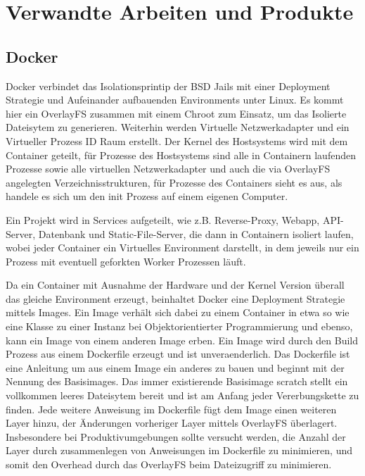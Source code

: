 \section{Verwandte Arbeiten und Produkte}
\label{sec:related-work}

\subsection{Docker}
Docker verbindet das Isolationsprintip der BSD Jails mit einer Deployment
Strategie und Aufeinander aufbauenden Environments unter Linux.
Es kommt hier ein OverlayFS zusammen mit einem Chroot zum Einsatz, um das
Isolierte Dateisytem zu generieren. Weiterhin werden Virtuelle Netzwerkadapter
und ein Virtueller Prozess ID Raum erstellt. Der Kernel des Hostsystems wird mit
dem Container geteilt, für Prozesse des Hostsystems sind alle in Containern
laufenden Prozesse sowie alle virtuellen Netzwerkadapter und auch die via
OverlayFS angelegten Verzeichnisstrukturen, für Prozesse des Containers
sieht es aus, als handele es sich um den init Prozess auf einem eigenen
Computer.

Ein Projekt wird in Services aufgeteilt, wie z.B. Reverse-Proxy, Webapp,
API-Server, Datenbank und Static-File-Server, die dann in Containern isoliert
laufen, wobei jeder Container ein Virtuelles Environment darstellt, in dem 
jeweils nur ein Prozess mit eventuell geforkten Worker Prozessen läuft.

Da ein Container mit Ausnahme der Hardware und der Kernel Version überall
das gleiche Environment erzeugt, beinhaltet Docker eine Deployment Strategie
mittels Images. Ein Image verhält sich dabei zu einem Container in etwa so
wie eine Klasse zu einer Instanz bei Objektorientierter Programmierung und
ebenso, kann ein Image von einem anderen Image erben. Ein Image wird durch den
Build Prozess aus einem Dockerfile erzeugt und ist unveraenderlich. Das
Dockerfile ist eine Anleitung um aus einem Image ein anderes zu bauen und
beginnt mit der Nennung des Basisimages. Das immer existierende Basisimage
scratch stellt ein vollkommen leeres Dateisytem bereit und ist am Anfang jeder
Vererbungskette zu finden. Jede weitere Anweisung im Dockerfile fügt dem
Image einen weiteren Layer hinzu, der Änderungen vorheriger Layer mittels
OverlayFS überlagert. Insbesondere bei Produktivumgebungen sollte versucht
werden, die Anzahl der Layer durch zusammenlegen von Anweisungen im Dockerfile
zu minimieren, und somit den Overhead durch das OverlayFS beim Dateizugriff zu
minimieren.

